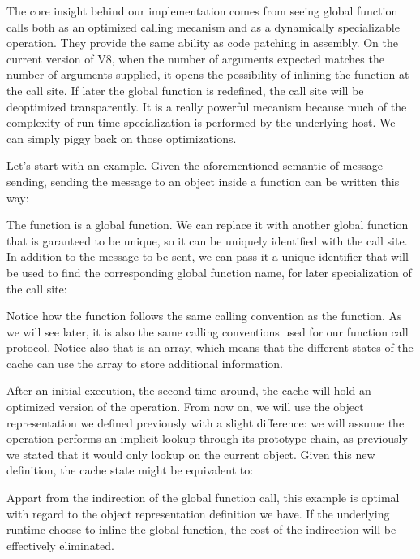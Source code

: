 The core insight behind our implementation comes from seeing global function
calls both as an optimized calling mecanism and as a dynamically specializable
operation. They provide the same ability as code patching in assembly. On
the current version of V8, when the number of arguments expected matches the
number of arguments supplied, it opens the possibility of inlining the function
at the call site. If later the global function is redefined, the call site will
be deoptimized transparently. It is a really powerful mecanism because much of
the complexity of run-time specialization is performed by the underlying host.
We can simply piggy back on those optimizations.

Let's start with an example. Given the aforementioned semantic of message
sending, sending the message  to an object  inside a 
function can be written this way:


The  function is a global function. We can replace it with another
global function that is garanteed to be unique, so it can be uniquely
identified with the call site. In addition to the message to be sent, we can
pass it a unique identifier that will be used to find the corresponding global
function name, for later specialization of the call site:


Notice how the  function follows the same calling convention as
the  function. As we will see later, it is also the same calling
conventions used for our function call protocol. Notice also that
 is an array, which means that the different states of the cache
can use the array to store additional information.

After an initial execution, the second time around, the cache will hold an
optimized version of the operation. From now on, we will use the object
representation we defined previously with a slight difference: we will assume
the  operation performs an implicit lookup through its prototype chain,
as previously we stated that it would only lookup on the current object.
Given this new definition, the cache state might be equivalent to:


Appart from the indirection of the global function call, this example is
optimal with regard to the object representation definition we have. If the
underlying runtime choose to inline the global function, the cost of the
indirection will be effectively eliminated.

